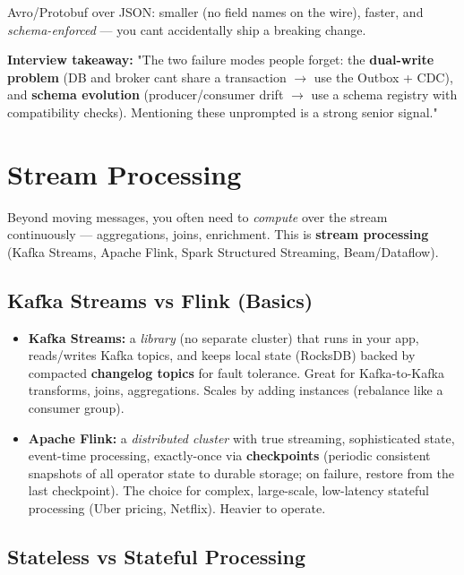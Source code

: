 \documentclass[11pt]{article}
\providecommand{\tightlist}{\setlength{\itemsep}{1pt}\setlength{\parskip}{0pt}}
\begin{document}
Avro/Protobuf over JSON: smaller (no field names on the wire), faster, and \emph{schema-enforced} --- you can\textquotesingle t accidentally ship a breaking change.

\textbf{Interview takeaway:} "The two failure modes people forget: the \textbf{dual-write problem} (DB and broker can\textquotesingle t share a transaction \(\rightarrow\) use the Outbox + CDC), and \textbf{schema evolution} (producer/consumer drift \(\rightarrow\) use a schema registry with compatibility checks). Mentioning these unprompted is a strong senior signal."

\section{Stream Processing}\label{stream-processing}

Beyond moving messages, you often need to \emph{compute} over the stream continuously --- aggregations, joins, enrichment. This is \textbf{stream processing} (Kafka Streams, Apache Flink, Spark Structured Streaming, Beam/Dataflow).

\subsection{Kafka Streams vs Flink (Basics)}\label{kafka-streams-vs-flink-basics}

\begin{itemize}
\tightlist
\item
  \textbf{Kafka Streams:} a \emph{library} (no separate cluster) that runs in your app, reads/writes Kafka topics, and keeps local state (RocksDB) backed by compacted \textbf{changelog topics} for fault tolerance. Great for Kafka-to-Kafka transforms, joins, aggregations. Scales by adding instances (rebalance like a consumer group).
\item
  \textbf{Apache Flink:} a \emph{distributed cluster} with true streaming, sophisticated state, event-time processing, exactly-once via \textbf{checkpoints} (periodic consistent snapshots of all operator state to durable storage; on failure, restore from the last checkpoint). The choice for complex, large-scale, low-latency stateful processing (Uber pricing, Netflix). Heavier to operate.
\end{itemize}

\subsection{Stateless vs Stateful Processing}\label{stateless-vs-stateful-processing}
\end{document}
